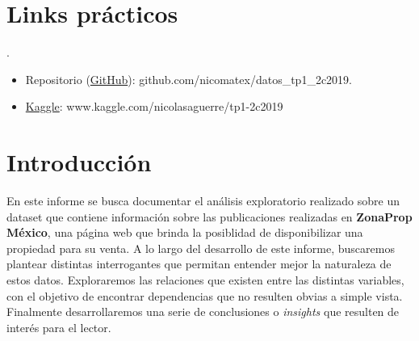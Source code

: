 \documentclass[
10pt, %
a4paper, %
oneside, %
headinclude,footinclude, %
BCOR5mm, %
]{scrartcl}
\begin{document}
\setcounter{tocdepth}{2} %

\tableofcontents %




\section*{Links prácticos} %
.
\begin{itemize}

    \item Repositorio (\href{https://github.com/nicomatex/datos_tp1_2c2019}{GitHub}): github.com/nicomatex/datos\_tp1\_2c2019.
    \item \href{https://www.kaggle.com/nicolasaguerre/tp1-2c2019}{Kaggle}: www.kaggle.com/nicolasaguerre/tp1-2c2019


\end{itemize}



\newpage %


\section{Introducci\'on}

En este informe se busca documentar el an\'alisis exploratorio realizado sobre un dataset que contiene informaci\'on sobre las publicaciones realizadas en \textbf{ZonaProp M\'exico}, una p\'agina web que brinda la posiblidad de disponibilizar una propiedad para su venta.
\vskip 2mm
A lo largo del desarrollo de este informe, buscaremos plantear distintas interrogantes que permitan entender mejor la naturaleza de estos datos. Exploraremos las relaciones que existen entre las distintas variables, con el objetivo de encontrar dependencias que no resulten obvias a simple vista.
\vskip 2mm
Finalmente desarrollaremos una serie de conclusiones o \textit{insights} que resulten de inter\'es para el lector.
\end{document}
